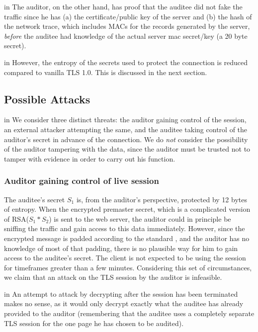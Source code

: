\documentclass[10pt,a4paper]{article}
\begin{document}
 in
\noindent The auditor, on the other hand, has proof that the auditee did not fake the traffic since he has (a) the certificate/public key of the server and (b) the hash of the network trace, which includes MACs for the records generated by the server, \emph{before} the auditee had knowledge of the actual server mac secret/key (a 20 byte secret).

 in
\noindent However, the entropy of the secrets used to protect the connection is reduced compared to vanilla TLS 1.0. This is discussed in the next section.

\subsection{Possible Attacks}
 in
\noindent We consider three distinct threats: the auditor gaining control of the session, an external attacker attempting the same, and the auditee taking control of the auditor's secret in advance of the connection. We do \emph{not} consider the possibility of the auditor tampering with the data, since the auditor must be trusted not to tamper with evidence in order to carry out his function.

\subsubsection{Auditor gaining control of live session}

\noindent The auditee's secret $S_1$ is, from the auditor's perspective, protected by 12 bytes of entropy. When the encrypted premaster secret, which is a complicated version of RSA($S_1*S_2$) is sent to the web server, the auditor could in principle be sniffing the traffic and gain access to this data immediately. However, since the encrypted message is padded according to the standard \cite{RSA_spec}, and the auditor has no knowledge of most of that padding, there is no plausible way for him to gain access to the auditee's secret. The client is not expected to be using the session for timeframes greater than a few minutes. Considering this set of circumstances, we claim that an attack on the TLS session by the auditor is infeasible.

 in
\noindent An attempt to attack by decrypting after the session has been terminated makes no sense, as it would only decrypt exactly what the auditee has already provided to the auditor (remembering that the auditee uses a completely separate TLS session for the one page he has chosen to be audited).
\end{document}
